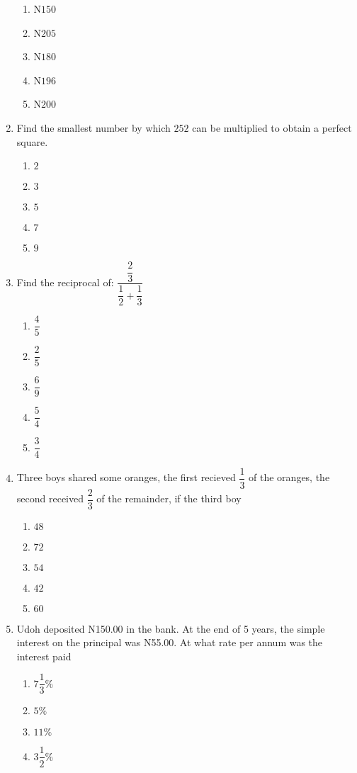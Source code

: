 \begin{multicols}{2}
\begin{enumerate}[label={\arabic*.}]
\begin{enumerate}[label={\Alph*.}]
    \item N\(150\)
    \item N\(205\)
    \item N\(180\)
    \item N\(196\)
    \item N\(200\)
    \end{enumerate}
\item Find the smallest number by which \(252\) can be multiplied to obtain a perfect square. 
    \begin{enumerate}[label={\Alph*.}]
    \item \(2\)
    \item \(3\)
    \item \(5\)
    \item \(7\)
    \item \(9\)
    \end{enumerate}
\item Find the reciprocal of: \(\dfrac{\dfrac{2}{3}}{\dfrac{1}{2} + \dfrac{1}{3}}\)
    \begin{enumerate}[label={\Alph*.}]
    \item \(\dfrac{4}{5}\)
    \item \(\dfrac{2}{5}\)
    \item \(\dfrac{6}{9}\)
    \item \(\dfrac{5}{4}\)
    \item \(\dfrac{3}{4}\)
    \end{enumerate}
\item Three boys shared some oranges, the first recieved \(\dfrac{1}{3}\) of the oranges, the second received \(\dfrac{2}{3}\) of the remainder, if the third boy
    \begin{enumerate}[label={\Alph*.}]
    \item \(48\)
    \item \(72\)
    \item \(54\)
    \item \(42\)
    \item \(60\)
    \end{enumerate}
\item Udoh deposited N150.00 in the bank. At the end of 5 years, the simple interest on the principal was N55.00. At what rate per annum was the interest paid 
    \begin{enumerate}[label={\Alph*.}]
    \item \(7\dfrac{1}{3}\%\)
    \item \(5\%\)
    \item \(11\%\)
    \item \(3\dfrac{1}{2}\%\)

\end{enumerate}
\end{enumerate}
\end{multicols}
